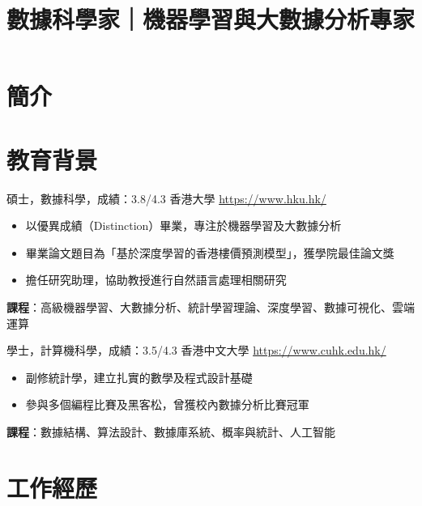 \documentclass[a4paper, serif, 10pt]{moderncv}
\title{數據科學家｜機器學習與大數據分析專家}
\begin{document}
\maketitle

\section{簡介}

\section{教育背景}

        {碩士，數據科學，成績：3.8/4.3}
        {香港大學}
        {\url{https://www.hku.hk/}}
        {}
        {\begin{itemize}
\item 以優異成績（Distinction）畢業，專注於機器學習及大數據分析
\item 畢業論文題目為「基於深度學習的香港樓價預測模型」，獲學院最佳論文獎
\item 擔任研究助理，協助教授進行自然語言處理相關研究
\end{itemize}
\textbf{課程}：高級機器學習、大數據分析、統計學習理論、深度學習、數據可視化、雲端運算}

        {學士，計算機科學，成績：3.5/4.3}
        {香港中文大學}
        {\url{https://www.cuhk.edu.hk/}}
        {}
        {\begin{itemize}
\item 副修統計學，建立扎實的數學及程式設計基礎
\item 參與多個編程比賽及黑客松，曾獲校內數據分析比賽冠軍
\end{itemize}
\textbf{課程}：數據結構、算法設計、數據庫系統、概率與統計、人工智能}
\section{工作經歷}
\end{document}
